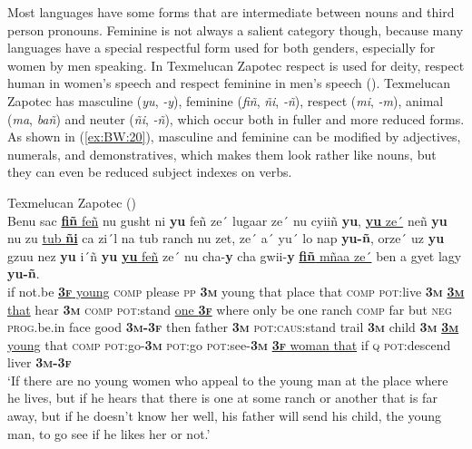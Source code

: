 \documentclass[output=collectionpaper]{langsci/langscibook}
\begin{document}
Most  languages have some forms that are intermediate between nouns and third person pronouns. Feminine is not always a salient category though, because many  languages have a special respectful form used for both genders, especially for women by men speaking. In Texmelucan Zapotec respect is used for deity, respect human in women’s speech and respect feminine in men’s speech (\citealt[290]{Speck1972}). Texmelucan Zapotec has masculine (\textit{yu}, \textit{-y}), feminine (\textit{fiñ}, \textit{ñi}, \textit{-ñ}), respect (\textit{mi}, \textit{-m}), animal (\textit{ma}, \textit{bañ}) and neuter (\textit{ñi}, \textit{-ñ}), which occur both in fuller and more reduced forms. As shown in (\ref{ex:BW:20}), masculine and feminine can be modified by adjectives, numerals, and demonstratives, which makes them look rather like nouns, but they can even be reduced subject indexes on verbs.

\ea\label{ex:BW:20}
Texmelucan Zapotec (\citealt[32]{Speck1972})\\
\gll Benu	sac	\uline{\textbf{fiñ}	feñ}	nu	gusht	ni	\textbf{yu}	feñ	ze´	lugaar	ze´	nu	cyiiñ	\textbf{yu}, \uline{\textbf{yu}	ze´}	neñ	\textbf{yu}	nu	zu	\uline{tub	\textbf{ñi}}	ca	zi´l	na 	tub	ranch	nu	zet, ze´	a´	yu´	lo	nap	\textbf{yu-ñ},	orze´	uz	\textbf{yu}	gzuu	nez	\textbf{yu}	i´ñ	\textbf{yu} \uline{\textbf{yu}	feñ}	ze´	nu	cha-\textbf{y}	cha	gwii-\textbf{y}	\uline{\textbf{fiñ}	mñaa	ze´} ben	a	gyet	lagy	\textbf{yu-ñ}.\\
if	not.be	\uline{\textbf{\textsc{3f}}	young}	\textsc{comp}	please	\textsc{pp}	\textbf{\textsc{3m}}	young	that	place	that	\textsc{comp}	\textsc{pot}:live	\textbf{\textsc{3m}} \uline{\textbf{\textsc{3m}}	that}	hear	\textbf{\textsc{3m}}	\textsc{comp}	\textsc{pot}:stand	\uline{one	\textbf{\textsc{3f}}}	where 	only 	be 	one	ranch	\textsc{comp}	far but	\textsc{neg}	\textsc{prog}.be.in	face	good	\textbf{\textsc{3m-3f}}	then	father 	\textbf{\textsc{3m}} 	\textsc{pot:caus}:stand	trail	\textbf{\textsc{3m}}	child	\textbf{\textsc{3m}} \uline{\textbf{\textsc{3m}}	young}	that	\textsc{comp}	\textsc{pot}:go-\textbf{\textsc{3m}} 	\textsc{pot}:go	\textsc{pot}:see-\textbf{\textsc{3m}}	\uline{\textbf{\textsc{3f}}	woman 	that} if	\textsc{q}	\textsc{pot}:descend 	liver	\textbf{\textsc{3m-3f}}\\
\glt ‘If there are no young women who appeal to the young man at the place where he lives, but if he hears that there is one at some ranch or another that is far away, but if he doesn’t know her well, his father will send his child, the young man, to go see if he likes her or not.’\\
\z
\end{document}
